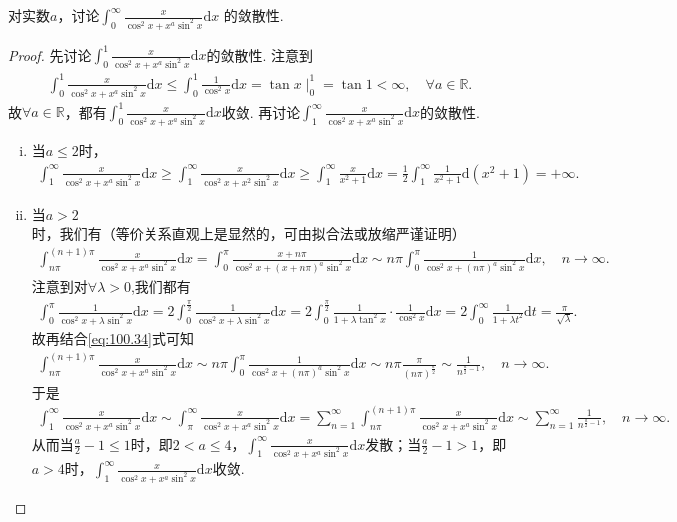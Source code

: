 \documentclass[../../main.tex]{subfiles}
\begin{document}
\begin{example}
对实数\(a\)，讨论$\int_{0}^{\infty}\frac{x}{\cos^{2}x + x^{a}\sin^{2}x}\mathrm{d}x$
的敛散性. 
\end{example}
\begin{proof}
先讨论$\int_0^1\frac{x}{\cos^2x+x^a\sin^2x}\mathrm{d}x$的敛散性. 注意到
\begin{align*}
\int_0^1\frac{x}{\cos^2x+x^a\sin^2x}\mathrm{d}x\leqslant \int_0^1\frac{1}{\cos^2x}\mathrm{d}x=\tan x\mid_{0}^{1}=\tan 1<\infty,\quad \forall a\in \mathbb{R}.
\end{align*}
故$\forall a\in \mathbb{R}$，都有$\int_0^1\frac{x}{\cos^2x+x^a\sin^2x}\mathrm{d}x$收敛.
再讨论$\int_1^{\infty}\frac{x}{\cos^2x+x^a\sin^2x}\mathrm{d}x$的敛散性.
\begin{enumerate}[(i)]
\item 当$a\leqslant 2$时，
\begin{align*}
\int_1^{\infty}\frac{x}{\cos^2x+x^a\sin^2x}\mathrm{d}x\geqslant \int_1^{\infty}\frac{x}{\cos^2x+x^2\sin^2x}\mathrm{d}x\geqslant \int_1^{\infty}\frac{x}{x^2+1}\mathrm{d}x=\frac{1}{2}\int_1^{\infty}\frac{1}{x^2+1}\mathrm{d}(x^2+1)=+\infty.
\end{align*}
\item 当$a>2$时，我们有（等价关系直观上是显然的，可由拟合法或放缩严谨证明）
\begin{align}
\int_{n\pi}^{(n+1)\pi}\frac{x}{\cos^2x+x^a\sin^2x}\mathrm{d}x=\int_0^{\pi}\frac{x+n\pi}{\cos^2x+(x+n\pi)^a\sin^2x}\mathrm{d}x\sim n\pi \int_0^{\pi}\frac{1}{\cos^2x+(n\pi)^a\sin^2x}\mathrm{d}x,\quad n\rightarrow \infty.\label{eq:100.34}
\end{align}
注意到对$\forall \lambda >0$,我们都有
\begin{align*}
\int_0^{\pi}\frac{1}{\cos^2x+\lambda \sin^2x}\mathrm{d}x=2\int_0^{\frac{\pi}{2}}\frac{1}{\cos^2x+\lambda \sin^2x}\mathrm{d}x=2\int_0^{\frac{\pi}{2}}\frac{1}{1+\lambda \tan^2x}\cdot \frac{1}{\cos^2x}\mathrm{d}x=2\int_0^{\infty}\frac{1}{1+\lambda t^2}\mathrm{d}t=\frac{\pi}{\sqrt{\lambda}}.
\end{align*}
故再结合\eqref{eq:100.34}式可知
\begin{align*}
\int_{n\pi}^{(n+1)\pi}\frac{x}{\cos^2x+x^a\sin^2x}\mathrm{d}x\sim n\pi \int_0^{\pi}\frac{1}{\cos^2x+(n\pi)^a\sin^2x}\mathrm{d}x\sim n\pi \frac{\pi}{(n\pi)^{\frac{a}{2}}}\sim \frac{1}{n^{\frac{a}{2}-1}},\quad n\rightarrow \infty.
\end{align*}
于是
\begin{align*}
\int_1^{\infty}\frac{x}{\cos^2x+x^a\sin^2x}\mathrm{d}x\sim \int_{\pi}^{\infty}\frac{x}{\cos^2x+x^a\sin^2x}\mathrm{d}x=\sum_{n=1}^{\infty}\int_{n\pi}^{(n+1)\pi}\frac{x}{\cos^2x+x^a\sin^2x}\mathrm{d}x\sim \sum_{n=1}^{\infty}\frac{1}{n^{\frac{a}{2}-1}},\quad n\rightarrow \infty.
\end{align*}
从而当$\frac{a}{2}-1\leqslant 1$时，即$2<a\leqslant 4$，$\int_1^{\infty}\frac{x}{\cos^2x+x^a\sin^2x}\mathrm{d}x$发散；当$\frac{a}{2}-1>1$，即$a>4$时，$\int_1^{\infty}\frac{x}{\cos^2x+x^a\sin^2x}\mathrm{d}x$收敛.
\end{enumerate}


\end{proof}
\end{document}
